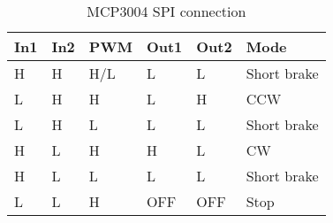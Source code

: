 \documentclass[
12pt, %
a4paper, %
oneside, %
headinclude,footinclude, %
BCOR5mm, %
]{scrartcl}
\begin{document}
\begin{table}[hbt]
\caption{MCP3004 SPI connection}
\centering
\begin{tabular}{llllll}
\toprule
In1  & In2 & PWM & Out1 & Out2 & Mode \\
\midrule
H    & H   & H/L & L    &L     & Short brake\\
L    & H   & H   & L    & H    & CCW\\
L    & H   & L   & L    & L    & Short brake\\
H    & L   & H   & H    & L    & CW\\
H    & L   & L   & L    & L    & Short brake\\
L    & L   & H   & OFF  & OFF  & Stop\\
\bottomrule
\end{tabular}
\label{tab:label}
\end{table}
\end{document}
